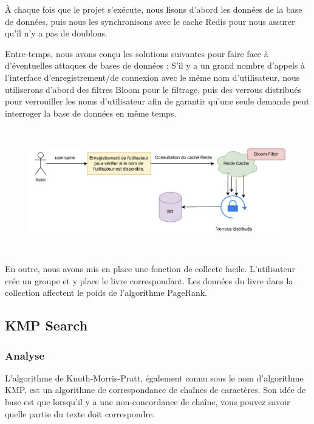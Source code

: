 \documentclass[11pt,english]{article}
\begin{document}
{    \indent À chaque fois que le projet s'exécute, nous lisons d'abord les données de la base de données, puis nous les synchronisons avec le cache Redis pour nous assurer qu'il n'y a pas de doublons.

    \indent Entre-temps, nous avons conçu les solutions suivantes pour faire face à d'éventuelles attaques de bases de données :
    S'il y a un grand nombre d'appels à l'interface d'enregistrement/de connexion avec le même nom d'utilisateur, nous utiliserons d'abord des filtres Bloom pour le filtrage, puis des verrous distribués pour verrouiller les noms d'utilisateur afin de garantir qu'une seule demande peut interroger la base de données en même temps.

    \begin{figure}[H]
        \begin{center}
            \includegraphics[height=5.4cm]{./src/user_regis.png}
        \end{center}
    \end{figure}

    \indent En outre, nous avons mis en place une fonction de collecte facile. L'utilisateur crée un groupe et y place le livre correspondant. Les données du livre dans la collection affectent le poids de l'algorithme PageRank.

    \subsection{KMP Search}

    \subsubsection{Analyse}

    \indent

    L'algorithme de Knuth-Morris-Pratt, également connu sous le nom d'algorithme KMP, est un algorithme de correspondance de chaînes de caractères. Son idée de base est que lorsqu'il y a une non-concordance de chaîne, vous pouvez savoir quelle partie du texte doit correspondre.

}
\end{document}
